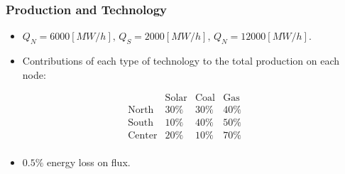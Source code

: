\documentclass[
11pt, %
]{beamer}
\begin{document}
	\begin{frame}
		\frametitle{Production and Technology}
		
		\begin{itemize}
			\item \(Q_N=6000[MW/h],\,Q_S=2000[MW/h],\,Q_N=12000[MW/h]\).
			\item Contributions of each type of technology to the total production on each node:
		\end{itemize}
		
		\begin{equation*}\begin{array}{c|c|c|c}
				& \text{Solar} & \text{Coal} & \text{Gas} \\ \hline
				\text{North} & 30\% & 30\% & 40\% \\
				\text{South} & 10\% & 40\% & 50\% \\
				\text{Center} & 20\% & 10\% & 70\% \\
		\end{array}\end{equation*}
	
		\begin{itemize}
			\item \(0.5\%\) energy loss on flux.
		\end{itemize}
	\end{frame}
	
	
\end{document}
